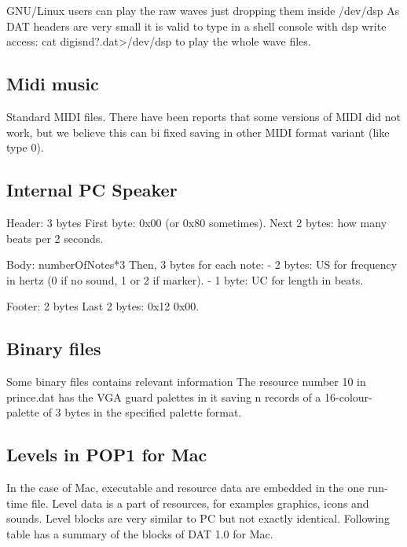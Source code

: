 \documentclass{article}
\begin{document}
 GNU/Linux users can play the raw waves just dropping them inside /dev/dsp
 As DAT headers are very small it is valid to type in a shell console with
 dsp write access: cat digisnd?.dat>/dev/dsp to play the whole wave files.

\subsection{Midi music}
 Standard MIDI files. There have been reports that some versions of MIDI
 did not work, but we believe this can bi fixed saving in other MIDI
 format variant (like type 0).

\subsection{Internal PC Speaker}
 Header: 3 bytes
  First byte: 0x00 (or 0x80 sometimes).
  Next 2 bytes: how many beats per 2 seconds.

 Body: numberOfNotes*3
  Then, 3 bytes for each note:
   - 2 bytes: US for frequency in hertz (0 if no sound, 1 or 2 if marker).
   - 1 byte:  UC for length in beats.

 Footer: 2 bytes
  Last 2 bytes: 0x12 0x00.

\subsection{Binary files \label{binary files}}
 Some binary files contains relevant information
 The resource number 10 in prince.dat has the VGA guard palettes in it
 saving n records of a 16-colour-palette of 3 bytes in the specified
 palette format.

\subsection{Levels in POP1 for Mac}
 In the case of Mac, executable and resource data are embedded in the 
 one run-time file. Level data is a part of resources, for examples
 graphics, icons and sounds. Level blocks are very similar to PC but
 not exactly identical. Following table has a summary of the blocks of
 DAT 1.0 for Mac.
 
\end{document}
